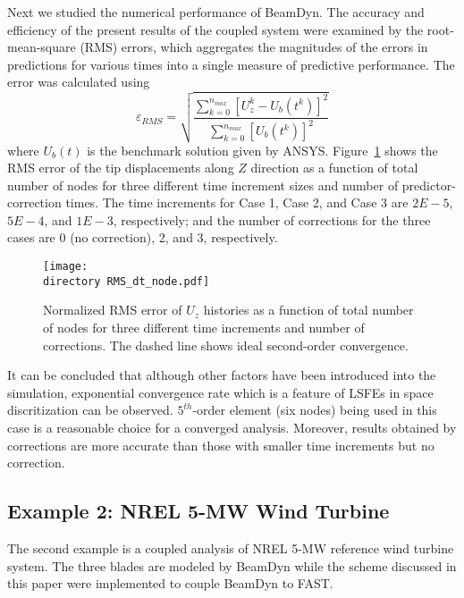 \documentclass{aiaa-tc}
\def\directory{EPSF/}
\begin{document}
Next we studied the numerical performance of BeamDyn. The accuracy and efficiency of the present results of the coupled system were examined by the root-mean-square (RMS) errors, which aggregates the magnitudes of the errors in predictions for various times into a single measure of predictive performance. The error was calculated using
\begin{equation}
\varepsilon_{RMS}=\sqrt{\frac{\sum_{k=0}^{n_{max}}[U_z^k-U_b(t^k)]^2}{\sum_{k=0}^{n_{max}}[U_b(t^k)]^2}}
\label{RMSdefi}
\end{equation} 
where $U_b(t)$ is the benchmark solution given by ANSYS. Figure~\ref{fig:ConvDTNode} shows the RMS error of the tip displacements along $Z$ direction as a function of total number of nodes for three different time increment sizes and number of predictor-correction times. The time increments for Case 1, Case 2, and Case 3 are $2E-5$, $5E-4$, and $1E-3$, respectively; and the number of corrections for the three cases are 0 (no correction), 2, and 3, respectively.
\begin{figure}
\centering
\texttt{[image: \\directory RMS\_dt\_node.pdf]}
\caption{Normalized RMS error of $U_z$ histories as a function of total number of nodes for three different time increments and number of corrections. The dashed line shows ideal second-order convergence.} 
\label{fig:ConvDTNode}
\end{figure}
It can be concluded that although other factors have been introduced into the simulation, exponential convergence rate which is a feature of LSFEs in space discritization can be observed. $5^{th}$-order element (six nodes) being used in this case is a reasonable choice for a converged analysis. Moreover, results obtained by corrections are more accurate than those with smaller time increments but no correction.

\subsection{Example 2: NREL 5-MW Wind Turbine}
The second example is a coupled analysis of NREL 5-MW reference wind turbine system. The three blades are modeled by BeamDyn while the scheme discussed in this paper  were implemented to couple BeamDyn to FAST. 
\end{document}
